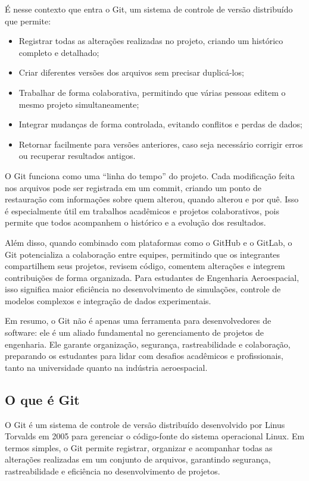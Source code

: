 É nesse contexto que entra o Git, um sistema de controle de versão distribuído que permite:

\begin{itemize}
    \item Registrar todas as alterações realizadas no projeto, criando um histórico completo e detalhado;
    \item Criar diferentes versões dos arquivos sem precisar duplicá-los;
    \item Trabalhar de forma colaborativa, permitindo que várias pessoas editem o mesmo projeto simultaneamente;
    \item Integrar mudanças de forma controlada, evitando conflitos e perdas de dados;
    \item Retornar facilmente para versões anteriores, caso seja necessário corrigir erros ou recuperar resultados antigos.
\end{itemize}

O Git funciona como uma “linha do tempo” do projeto. Cada modificação feita nos arquivos pode ser registrada em um commit, criando um ponto de restauração com informações sobre quem alterou, quando alterou e por quê. Isso é especialmente útil em trabalhos acadêmicos e projetos colaborativos, pois permite que todos acompanhem o histórico e a evolução dos resultados.

Além disso, quando combinado com plataformas como o GitHub e o GitLab, o Git potencializa a colaboração entre equipes, permitindo que os integrantes compartilhem seus projetos, revisem código, comentem alterações e integrem contribuições de forma organizada. Para estudantes de Engenharia Aeroespacial, isso significa maior eficiência no desenvolvimento de simulações, controle de modelos complexos e integração de dados experimentais.

Em resumo, o Git não é apenas uma ferramenta para desenvolvedores de software: ele é um aliado fundamental no gerenciamento de projetos de engenharia. Ele garante organização, segurança, rastreabilidade e colaboração, preparando os estudantes para lidar com desafios acadêmicos e profissionais, tanto na universidade quanto na indústria aeroespacial.

\subsection{O que é Git}

O Git é um sistema de controle de versão distribuído desenvolvido por Linus Torvalds em 2005 para gerenciar o código-fonte do sistema operacional Linux. Em termos simples, o Git permite registrar, organizar e acompanhar todas as alterações realizadas em um conjunto de arquivos, garantindo segurança, rastreabilidade e eficiência no desenvolvimento de projetos.

